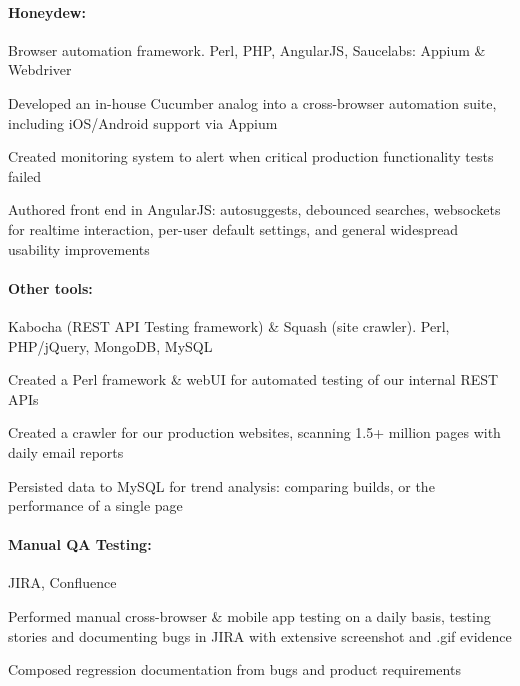 \begin{position}

  \paragraph{Honeydew:} Browser automation framework. Perl, PHP, AngularJS, Saucelabs: Appium \& Webdriver
  \begin{myitem}
  \item Developed an in-house Cucumber analog into a cross-browser automation suite, including iOS/Android support via Appium
  \item Created monitoring system to alert when critical production functionality tests failed
  \item Authored front end in AngularJS: autosuggests, debounced searches, websockets for realtime interaction, per-user default settings, and general widespread usability improvements
  \end{myitem}
  \paragraph{Other tools:} Kabocha (REST API Testing framework) \& Squash (site crawler). Perl, PHP/jQuery, MongoDB, MySQL
  \begin{myitem}
  \item Created a Perl framework \& webUI for automated testing of our internal REST APIs
  \item Created a crawler for our production websites, scanning 1.5+ million pages with daily email reports
  \item Persisted data to MySQL for trend analysis: comparing builds, or the performance of a single page
  \end{myitem}
  \paragraph{Manual QA Testing:} JIRA, Confluence
  \begin{myitem}
  \item Performed manual cross-browser \& mobile app testing on a daily basis, testing stories and documenting bugs in JIRA with extensive screenshot and .gif evidence
  \item Composed regression documentation from bugs and product requirements
  \end{myitem}
\end{position}
%
